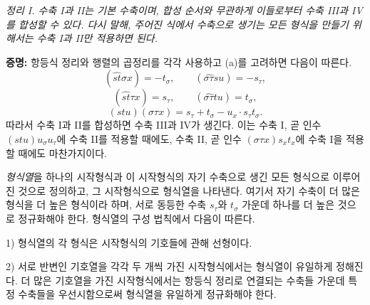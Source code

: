\emph{정리 I. 수축 I과 II는 기본 수축이며, 합성 순서와 무관하게 이들로부터 수축 III과 IV를 합성할 수 있다. 다시 말해, 주어진 식에서 수축으로 생기는 모든 형식을 만들기 위해서는 수축 I과 II만 적용하면 된다.}

\textbf{증명:} 항등식 정리와 행렬의 곱정리를 각각 사용하고 (a)를 고려하면 다음이 따른다.
\[
(\widehat{st}\sigma x)=-t_\sigma,\qquad
(\widehat{\sigma\tau}su)=-s_\tau,
\]
\[
(\widehat{st}\tau x)=s_\tau,\qquad
(\widehat{\sigma\tau}tu)=t_\sigma,
\]
\[
(stu)(\sigma\tau x)=s_\tau+t_\sigma-u_x\cdot s_\tau t_\sigma .
\]
따라서 수축 I과 II를 합성하면 수축 III과 IV가 생긴다. 이는 수축 I, 곧 인수 $(stu)u_\sigma u_\tau$에 수축 II를 적용할 때에도, 수축 II, 곧 인수 $(\sigma\tau x)s_xt_x$에 수축 I을 적용할 때에도 마찬가지이다.

\emph{형식열}\setcounter{footnote}{9}을 하나의 시작형식과 이 시작형식의 자기 수축으로 생긴 모든 형식으로 이루어진 것으로 정의하고, 그 시작형식으로 형식열을 나타낸다. 여기서 자기 수축이 더 많은 형식을 \glqq{}더 높은 형식\grqq{}이라 하며, 서로 동등한 수축 $s_\tau$와 $t_\sigma$ 가운데 하나를 더 높은 것으로 정규화해야 한다. 형식열의 구성 법칙에서 다음이 따른다.

1) 형식열의 각 형식은 시작형식의 기호들에 관해 선형이다.

2) 서로 반변인 기호열을 각각 두 개씩 가진 시작형식에서는 형식열이 유일하게 정해진다. 더 많은 기호열을 가진 시작형식에서는 항등식 정리로 연결되는 수축들 가운데 특정 수축들을 우선시함으로써 형식열을 유일하게 정규화해야 한다.

